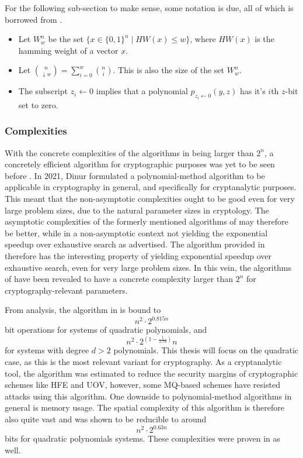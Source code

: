 For the following sub-section to make sense, some notation is due, all of which is borrowed from \cite{eurocrypt-2021-30841}.
\begin{itemize}
    \item Let $W^n_w$ be the set $\{x \in \{0, 1\}^n \mid HW(x) \leq w \}$, where $HW(x)$ is the hamming weight of a vector $x$. 
    \item Let $\binom{n}{\downarrow w} = \sum^w_{i = 0} \binom{n}{i}$. This is also the size of the set $W^n_w$.
    \item The subscript $z_i \leftarrow 0$ implies that a polynomial $p_{z_i \leftarrow 0}(y,z)$ has it's $i$th $z$-bit set to zero.
\end{itemize}

\subsubsection{Complexities}

With the concrete complexities of the algorithms in \cite{doi:10.1137/1.9781611974782.143, Williams2014ThePM} being larger than $2^n$, a concretely efficient algorithm for cryptographic purposes was yet to be seen before \cite{eurocrypt-2021-30841}. In 2021, Dinur formulated a polynomial-method algorithm to be applicable in cryptography in general, and specifically for cryptanalytic purposes. This meant that the non-asymptotic complexities ought to be good even for very large problem sizes, due to the natural parameter sizes in cryptology. The asymptotic complexities of the formerly mentioned algorithms of \cite{doi:10.1137/1.9781611974782.143, Williams2014ThePM} may therefore be better, while in a non-asymptotic context not yielding the exponential speedup over exhaustive search as advertised. The algorithm provided in \cite{eurocrypt-2021-30841} therefore has the interesting property of yielding exponential speedup over exhaustive search, even for very large problem sizes. In this vein, the algorithms of \cite{doi:10.1137/1.9781611974782.143, Williams2014ThePM} have been revealed to have a concrete complexity larger than $2^n$ for cryptography-relevant parameters.

From analysis, the algorithm in \cite{eurocrypt-2021-30841} is bound to 
$$
    n^2 \cdot 2^{0.815n}
$$ 
bit operations for systems of quadratic polynomials, and 
$$
    n^2 \cdot 2^{(1 - \frac{1}{2.7d})}n
$$ 
for systems with degree $d > 2$ polynomials. This thesis will focus on the quadratic case, as this is the most relevant variant for cryptography. As a cryptanalytic tool, the algorithm was estimated to reduce the security margins of cryptographic schemes like HFE and UOV, however, some MQ-based schemes have resisted attacks using this algorithm. One downside to polynomial-method algorithms in general is memory usage. The spatial complexity of this algorithm is therefore also quite vast and was shown to be reducible to around 
$$
    n^2 \cdot 2^{0.63n}
$$ 
bits for quadratic polynomials systems. These complexities were proven in \cite{eurocrypt-2021-30841} as well.

